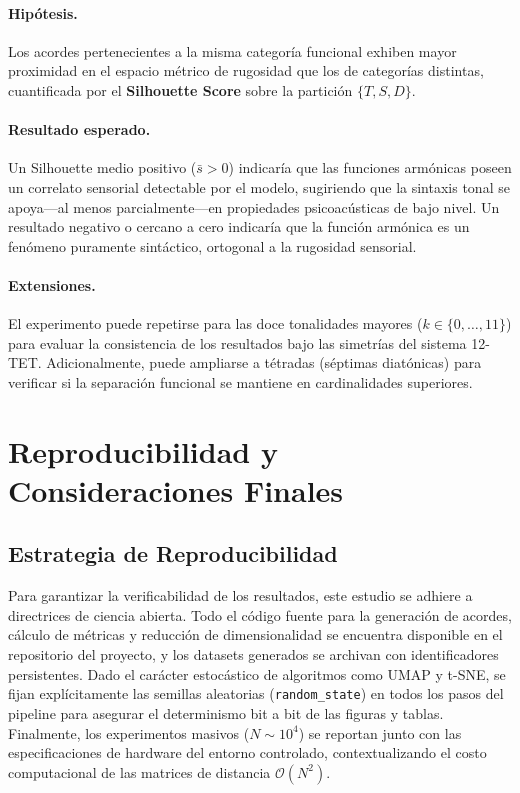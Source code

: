 \paragraph{Hipótesis.}
Los acordes pertenecientes a la misma categoría funcional exhiben mayor proximidad en el espacio métrico de rugosidad que los de categorías distintas, cuantificada por el \textbf{Silhouette Score} sobre la partición $\{T, S, D\}$.

\paragraph{Resultado esperado.}
Un Silhouette medio positivo ($\bar{s} > 0$) indicaría que las funciones armónicas poseen un correlato sensorial detectable por el modelo, sugiriendo que la sintaxis tonal se apoya---al menos parcialmente---en propiedades psicoacústicas de bajo nivel. Un resultado negativo o cercano a cero indicaría que la función armónica es un fenómeno puramente sintáctico, ortogonal a la rugosidad sensorial.

\paragraph{Extensiones.}
El experimento puede repetirse para las doce tonalidades mayores ($k \in \{0, \dots, 11\}$) para evaluar la consistencia de los resultados bajo las simetrías del sistema 12-TET. Adicionalmente, puede ampliarse a tétradas (séptimas diatónicas) para verificar si la separación funcional se mantiene en cardinalidades superiores.

\section{Reproducibilidad y Consideraciones Finales}
\label{sec:reproducibilidad}

\subsection{Estrategia de Reproducibilidad}
Para garantizar la verificabilidad de los resultados, este estudio se adhiere a directrices de ciencia abierta. Todo el código fuente para la generación de acordes, cálculo de métricas y reducción de dimensionalidad se encuentra disponible en el repositorio del proyecto, y los datasets generados se archivan con identificadores persistentes. Dado el carácter estocástico de algoritmos como UMAP y t-SNE, se fijan explícitamente las semillas aleatorias (\texttt{random\_state}) en todos los pasos del pipeline para asegurar el determinismo bit a bit de las figuras y tablas. Finalmente, los experimentos masivos ($N \sim 10^4$) se reportan junto con las especificaciones de hardware del entorno controlado, contextualizando el costo computacional de las matrices de distancia $\mathcal{O}(N^2)$.

